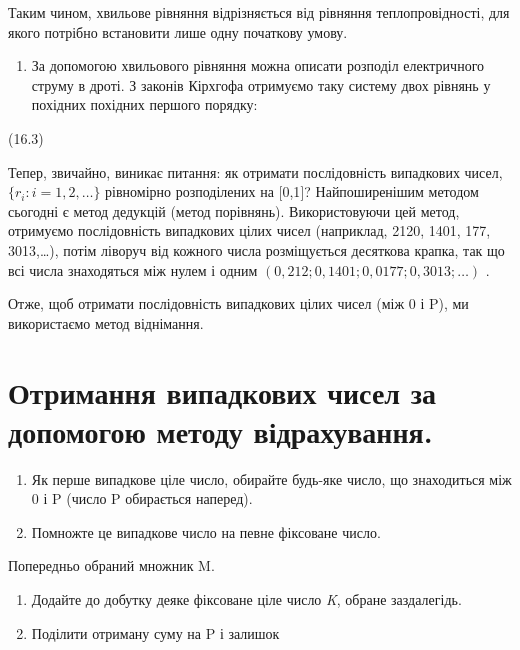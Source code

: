 \documentclass[
  ukrainian,
]{article}
\providecommand{\tightlist}{%
  \setlength{\itemsep}{0pt}\setlength{\parskip}{0pt}}
\begin{document}
Таким чином, хвильове рівняння відрізняється від рівняння
теплопровідності, для якого потрібно встановити лише одну початкову
умову.

\begin{enumerate}
\def\labelenumi{\arabic{enumi}.}
\setcounter{enumi}{3}
\tightlist
\item
  За допомогою хвильового рівняння можна описати розподіл електричного
  струму в дроті. З законів Кірхгофа отримуємо таку систему двох рівнянь
  у похідних похідних першого порядку:
\end{enumerate}

(16.3)

Тепер, звичайно, виникає питання: як отримати послідовність випадкових
чисел, \(\{r_i: i=1,2,\ldots\}\) рівномірно розподілених на {[}0,1{]}?
Найпоширенішим методом сьогодні є метод дедукцій (метод порівнянь).
Використовуючи цей метод, отримуємо послідовність випадкових цілих чисел
(наприклад, 2120, 1401, 177, 3013,\ldots), потім ліворуч від кожного
числа розміщується десяткова крапка, так що всі числа знаходяться між
нулем і одним \((0,212; 0,1401; 0,0177; 0,3013; \ldots)\) .

Отже, щоб отримати послідовність випадкових цілих чисел (між 0 і P), ми
використаємо метод віднімання.

\section{Отримання випадкових чисел за допомогою методу
відрахування.}\label{ux43eux442ux440ux438ux43cux430ux43dux43dux44f-ux432ux438ux43fux430ux434ux43aux43eux432ux438ux445-ux447ux438ux441ux435ux43b-ux437ux430-ux434ux43eux43fux43eux43cux43eux433ux43eux44e-ux43cux435ux442ux43eux434ux443-ux432ux456ux434ux440ux430ux445ux443ux432ux430ux43dux43dux44f.}

\begin{enumerate}
\def\labelenumi{\arabic{enumi}.}
\item
  Як перше випадкове ціле число, обирайте будь-яке число, що знаходиться
  між 0 і P (число P обирається наперед).
\item
  Помножте це випадкове число на певне фіксоване число.
\end{enumerate}

Попередньо обраний множник M.

\begin{enumerate}
\def\labelenumi{\arabic{enumi}.}
\setcounter{enumi}{2}
\item
  Додайте до добутку деяке фіксоване ціле число \emph{K}, обране
  заздалегідь.
\item
  Поділити отриману суму на P і залишок
\end{enumerate}
\end{document}
